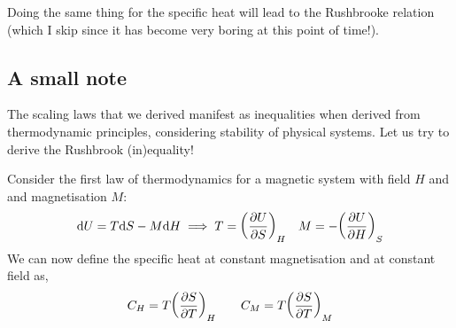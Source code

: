 Doing the same thing for the specific heat will lead to the Rushbrooke relation (which I skip since it has become very boring at this point of time!).
\subsection{A small note}
The scaling laws that we derived manifest as inequalities when derived from thermodynamic principles, considering stability of physical systems. Let us try to derive the Rushbrook (in)equality! 

Consider the first law of thermodynamics for a magnetic system with field $H$ and and magnetisation $M$:
\begin{equation}
    \dd U = T\dd S - M \dd H \implies T = \qty(\pdv{U}{S})_{H} \quad M = -\qty(\pdv{U}{H})_{S}
\end{equation}
We can now define the specific heat at constant magnetisation and at constant field as, 
\begin{align*}
    C_H = T \qty(\pdv{S}{T})_H\qquad   C_M = T \qty(\pdv{S}{T})_M
\end{align*}